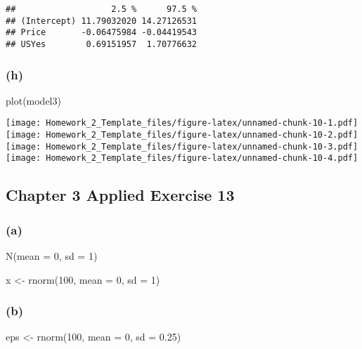\documentclass[
]{article}
\newenvironment{Shaded}{\begin{snugshade}}{\end{snugshade}}
\newcommand{\AttributeTok}[1]{\textcolor[rgb]{0.77,0.63,0.00}{#1}}
\newcommand{\DecValTok}[1]{\textcolor[rgb]{0.00,0.00,0.81}{#1}}
\newcommand{\FloatTok}[1]{\textcolor[rgb]{0.00,0.00,0.81}{#1}}
\newcommand{\FunctionTok}[1]{\textcolor[rgb]{0.00,0.00,0.00}{#1}}
\newcommand{\NormalTok}[1]{#1}
\newcommand{\OtherTok}[1]{\textcolor[rgb]{0.56,0.35,0.01}{#1}}
\begin{document}
\begin{verbatim}
##                   2.5 %      97.5 %
## (Intercept) 11.79032020 14.27126531
## Price       -0.06475984 -0.04419543
## USYes        0.69151957  1.70776632
\end{verbatim}

\hypertarget{h}{%
\subsubsection{(h)}\label{h}}

\begin{Shaded}
\begin{Highlighting}[]
\FunctionTok{plot}\NormalTok{(model3)}
\end{Highlighting}
\end{Shaded}

\texttt{[image: Homework\_2\_Template\_files/figure-latex/unnamed-chunk-10-1.pdf]}
\texttt{[image: Homework\_2\_Template\_files/figure-latex/unnamed-chunk-10-2.pdf]}
\texttt{[image: Homework\_2\_Template\_files/figure-latex/unnamed-chunk-10-3.pdf]}
\texttt{[image: Homework\_2\_Template\_files/figure-latex/unnamed-chunk-10-4.pdf]}

\hypertarget{chapter-3-applied-exercise-13}{%
\subsection{Chapter 3 Applied Exercise
13}\label{chapter-3-applied-exercise-13}}

\hypertarget{a-4}{%
\subsubsection{(a)}\label{a-4}}

N(mean = 0, sd = 1)

\begin{Shaded}
\begin{Highlighting}[]
\NormalTok{x }\OtherTok{\textless{}{-}} \FunctionTok{rnorm}\NormalTok{(}\DecValTok{100}\NormalTok{, }\AttributeTok{mean =} \DecValTok{0}\NormalTok{, }\AttributeTok{sd =} \DecValTok{1}\NormalTok{)}
\end{Highlighting}
\end{Shaded}

\hypertarget{b-3}{%
\subsubsection{(b)}\label{b-3}}

\begin{Shaded}
\begin{Highlighting}[]
\NormalTok{eps }\OtherTok{\textless{}{-}} \FunctionTok{rnorm}\NormalTok{(}\DecValTok{100}\NormalTok{, }\AttributeTok{mean =} \DecValTok{0}\NormalTok{, }\AttributeTok{sd =} \FloatTok{0.25}\NormalTok{)}
\end{Highlighting}
\end{Shaded}
\end{document}
